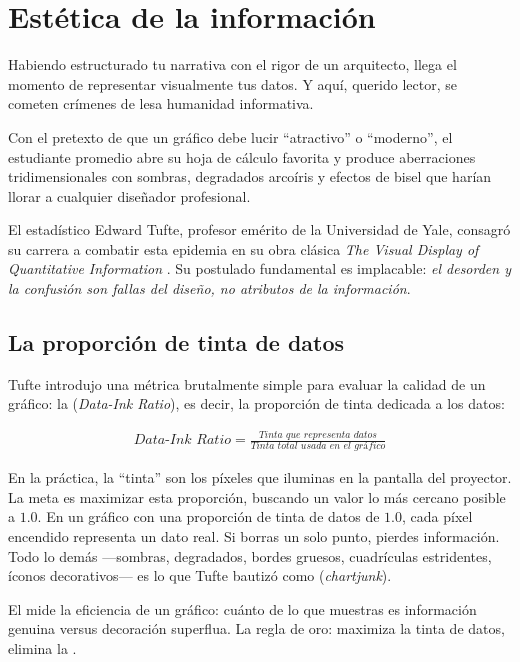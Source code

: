 \section{Estética de la información}
\label{sec:esteticatufte}

Habiendo estructurado tu narrativa con el rigor de un arquitecto, llega el momento de representar visualmente tus datos.
Y aquí, querido lector, se cometen crímenes de lesa humanidad informativa.

Con el pretexto de que un gráfico debe lucir “atractivo” o “moderno”, el estudiante promedio abre su hoja de cálculo favorita y produce aberraciones tridimensionales con sombras, degradados arcoíris y efectos de bisel que harían llorar a cualquier diseñador profesional.

El estadístico Edward Tufte, profesor emérito de la Universidad de Yale, consagró su carrera a combatir esta epidemia en su obra clásica \emph{The Visual Display of Quantitative Information} \cite{Tufte1983}.
Su postulado fundamental es implacable: \emph{el desorden y la confusión son fallas del diseño, no atributos de la información}.

\subsection*{La proporción de tinta de datos}

Tufte introdujo una métrica brutalmente simple para evaluar la calidad de un gráfico: la  (\emph{Data-Ink Ratio}), es decir, la proporción de tinta dedicada a los datos:

\begin{align*}
	\textit{Data-Ink Ratio} = \frac{\textit{Tinta que representa datos}}{\textit{Tinta total usada en el gráfico}}
\end{align*}

En la práctica, la “tinta” son los píxeles que iluminas en la pantalla del proyector.
La meta es maximizar esta proporción, buscando un valor lo más cercano posible a \(1.0\).
En un gráfico con una proporción de tinta de datos de \(1.0\), cada píxel encendido representa un dato real.
Si borras un solo punto, pierdes información.
Todo lo demás —sombras, degradados, bordes gruesos, cuadrículas estridentes, íconos decorativos— es lo que Tufte bautizó como  (\emph{chartjunk}).

\begin{remember}
	\label{rem:datainkratio}
	El  mide la eficiencia de un gráfico: cuánto de lo que muestras es información genuina versus decoración superflua.
	La regla de oro: maximiza la tinta de datos, elimina la .
\end{remember}

